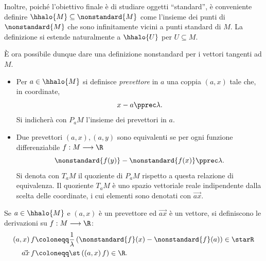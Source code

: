 
Inoltre, poiché l'obiettivo finale è di studiare oggetti ``standard'', è conveniente definire $ \hhalo{M} \subseteq \nonstandard{M}$ come l'insieme dei punti di $ \nonstandard{M} $ che sono infinitamente vicini a punti standard di $ M $. La definizione si estende naturalmente a $ \hhalo{U} $ per $ U \subseteq M $.

È ora possibile dunque dare una definizione nonstandard per i vettori tangenti ad $ M $.\begin{itemize}
    \item Per $ a \in \hhalo{M} $ si definisce \emph{prevettore} in $ a $ una coppia $ (a,x) $ tale che, in coordinate, \begin{equation*}
        x-a\pprec \lambda.
    \end{equation*}Si indicherà con $ P_{a}M  $ l'insieme dei prevettori in $ a $. 
    \item Due prevettori $ (a,x), (a,y) $ sono equivalenti se per ogni funzione differenziabile $ f: M \longrightarrow \R $ \begin{equation*}
        \nonstandard{f(y)}-\nonstandard{f(x)}\pprec \lambda.
    \end{equation*}Si denota con $ T_{a}M $ il quoziente di $ P_{a}M  $ rispetto a questa relazione di equivalenza. Il quoziente $ T_{a}M  $ è uno spazio vettoriale reale indipendente dalla scelta delle coordinate, i cui elementi sono denotati con $ \vec{ax} $.
\end{itemize}

Se $ a \in \hhalo{M} $ e $ (a,x) $ è un prevettore ed $ \vec{ax} $ è un vettore, si definiscono le derivazioni su $ f: M \longrightarrow \R $: \begin{align*}
    (a,x)\,f& \coloneqq \frac{1}{\lambda}\left(\nonstandard{f}(x)-\nonstandard{f}(a)\right) \in \starR\\
\vec{ax} \,f &\coloneqq \st\left((a,x)\,f\right) \in \R.
\end{align*}

